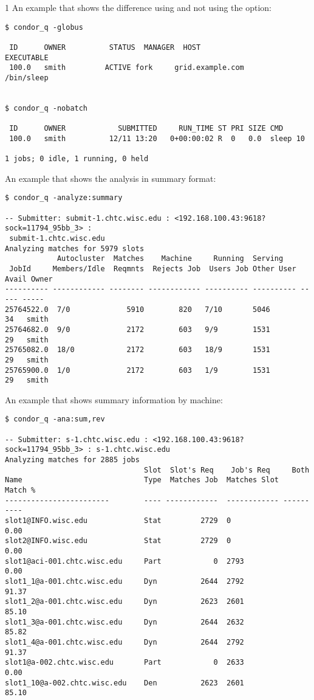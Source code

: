 \begin{ManPage}{\label{man-condor-q}}{1}
An example that shows the difference using and not using the
 option:
\footnotesize
\begin{verbatim}
$ condor_q -globus

 ID      OWNER          STATUS  MANAGER  HOST                EXECUTABLE
 100.0   smith         ACTIVE fork     grid.example.com       /bin/sleep


$ condor_q -nobatch

 ID      OWNER            SUBMITTED     RUN_TIME ST PRI SIZE CMD
 100.0   smith          12/11 13:20   0+00:00:02 R  0   0.0  sleep 10

1 jobs; 0 idle, 1 running, 0 held
\end{verbatim}
\normalsize

An example that shows the analysis in summary format:
\footnotesize
\begin{verbatim}
$ condor_q -analyze:summary

-- Submitter: submit-1.chtc.wisc.edu : <192.168.100.43:9618?sock=11794_95bb_3> :
 submit-1.chtc.wisc.edu
Analyzing matches for 5979 slots
            Autocluster  Matches    Machine     Running  Serving
 JobId     Members/Idle  Reqmnts  Rejects Job  Users Job Other User Avail Owner
---------- ------------ -------- ------------ ---------- ---------- ----- -----
25764522.0  7/0             5910        820   7/10       5046        34   smith
25764682.0  9/0             2172        603   9/9        1531        29   smith
25765082.0  18/0            2172        603   18/9       1531        29   smith
25765900.0  1/0             2172        603   1/9        1531        29   smith 
\end{verbatim}
\normalsize

An example that shows summary information by machine:
\footnotesize
\begin{verbatim}
$ condor_q -ana:sum,rev

-- Submitter: s-1.chtc.wisc.edu : <192.168.100.43:9618?sock=11794_95bb_3> : s-1.chtc.wisc.edu
Analyzing matches for 2885 jobs
                                Slot  Slot's Req    Job's Req     Both
Name                            Type  Matches Job  Matches Slot    Match %
------------------------        ---- ------------  ------------ ----------
slot1@INFO.wisc.edu             Stat         2729  0                  0.00
slot2@INFO.wisc.edu             Stat         2729  0                  0.00
slot1@aci-001.chtc.wisc.edu     Part            0  2793               0.00
slot1_1@a-001.chtc.wisc.edu     Dyn          2644  2792              91.37
slot1_2@a-001.chtc.wisc.edu     Dyn          2623  2601              85.10
slot1_3@a-001.chtc.wisc.edu     Dyn          2644  2632              85.82
slot1_4@a-001.chtc.wisc.edu     Dyn          2644  2792              91.37
slot1@a-002.chtc.wisc.edu       Part            0  2633               0.00
slot1_10@a-002.chtc.wisc.edu    Den          2623  2601              85.10 
\end{verbatim}
\normalsize


\end{ManPage}
